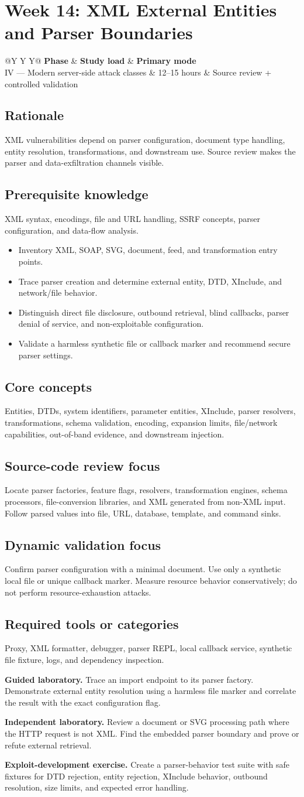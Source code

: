 \documentclass[11pt]{article}
\makeatletter
\newcommand{\weekheader}[4]{%
  \clearpage
  \section{Week #1: #2}
  \begin{tcolorbox}[colback=Navy,colframe=Navy,coltext=white]
    \begin{tabularx}{\linewidth}{@{}Y Y Y@{}}
      \textbf{Phase} & \textbf{Study load} & \textbf{Primary mode}\\
      #3 & #4 hours & Source review + controlled validation
    \end{tabularx}
  \end{tcolorbox}
}
\newcommand{\weekfield}[2]{%
  \Needspace{5\baselineskip}
  \subsection*{#1}
  #2
}
\makeatother
\begin{document}
\weekheader{14}{XML External Entities and Parser Boundaries}{IV --- Modern server-side attack classes}{12--15}

\weekfield{Rationale}{XML vulnerabilities depend on parser configuration,
document type handling, entity resolution, transformations, and downstream use.
Source review makes the parser and data-exfiltration channels visible.}

\weekfield{Prerequisite knowledge}{XML syntax, encodings, file and URL handling,
SSRF concepts, parser configuration, and data-flow analysis.}

\begin{objectivebox}
\begin{itemize}
  \item Inventory XML, SOAP, SVG, document, feed, and transformation entry points.
  \item Trace parser creation and determine external entity, DTD, XInclude, and network/file behavior.
  \item Distinguish direct file disclosure, outbound retrieval, blind callbacks, parser denial of service, and non-exploitable configuration.
  \item Validate a harmless synthetic file or callback marker and recommend secure parser settings.
\end{itemize}
\end{objectivebox}

\weekfield{Core concepts}{Entities, DTDs, system identifiers, parameter entities,
XInclude, parser resolvers, transformations, schema validation, encoding,
expansion limits, file/network capabilities, out-of-band evidence, and downstream
injection.}

\weekfield{Source-code review focus}{Locate parser factories, feature flags,
resolvers, transformation engines, schema processors, file-conversion libraries,
and XML generated from non-XML input. Follow parsed values into file, URL,
database, template, and command sinks.}

\weekfield{Dynamic validation focus}{Confirm parser configuration with a minimal
document. Use only a synthetic local file or unique callback marker. Measure
resource behavior conservatively; do not perform resource-exhaustion attacks.}

\weekfield{Required tools or categories}{Proxy, XML formatter, debugger, parser
REPL, local callback service, synthetic file fixture, logs, and dependency
inspection.}

\begin{labbox}
\textbf{Guided laboratory.} Trace an import endpoint to its parser factory.
Demonstrate external entity resolution using a harmless file marker and correlate
the result with the exact configuration flag.

\textbf{Independent laboratory.} Review a document or SVG processing path where
the HTTP request is not XML. Find the embedded parser boundary and prove or refute
external retrieval.

\textbf{Exploit-development exercise.} Create a parser-behavior test suite with
safe fixtures for DTD rejection, entity rejection, XInclude behavior, outbound
resolution, size limits, and expected error handling.
\end{labbox}
\end{document}
